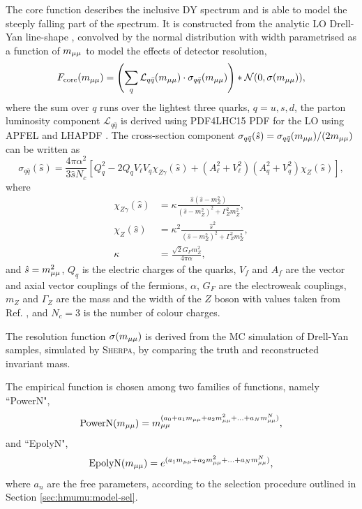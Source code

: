The core function describes the inclusive DY spectrum and
is able to model the steeply falling part of the spectrum.
It is constructed from the analytic LO Drell-Yan line-shape
\cite{Aaboud:2017ffb}, convolved by the normal distribution
with width parametrised as a function of $m_{\mu\mu}$ to model
the effects of detector resolution,
\begin{equation}
F_\text{core}(m_{\mu\mu}) =
\left( \sum_q \mathcal{L}_{q\bar q}(m_{\mu\mu}) \cdot \sigma_{q\bar q}(m_{\mu\mu}) \right) * \mathcal{N}(0, \sigma(m_{\mu\mu})),
\end{equation}
where the sum over $q$ runs over the lightest three quarks,
$q = u, s, d$, the parton luminosity component $\mathcal{L}_{q\bar q}$
is derived using PDF4LHC15 PDF for the LO using APFEL
\cite{Bertone:2013vaa} and LHAPDF \cite{Buckley:2014ana}.
The cross-section component
$\sigma_{q\bar q}(\hat s) = \sigma_{q\bar q}(m_{\mu\mu}) / (2m_{\mu\mu})$
can be written as \cite{ATLAS-CONF-2019-028}
\begin{equation}
\sigma_{q\bar q}(\hat s) = \frac{4\pi \alpha^2}{3\hat s N_c}
\left[
Q_q^2 - 2 Q_q V_\ell V_q \chi_{Z\gamma} (\hat s) +
(A_\ell^2 + V_\ell^2) (A_q^2 + V_q^2) \chi_Z(\hat s)
\right],
\end{equation}
where
\begin{align}
 \chi_{Z\gamma}(\hat s) & = \kappa \frac{\hat s (\hat s - m_Z^2)}{(\hat s - m_Z^2)^2 + \Gamma_Z^2 m_Z^2}, \\
 \chi_{Z}(\hat s)       & = \kappa^2 \frac{{\hat s}^2}{(\hat s - m_Z^2)^2 + \Gamma_Z^2 m_Z^2}, \\
 \kappa                 & = \frac{\sqrt{2}G_Fm_Z^2}{4\pi \alpha},
\end{align}
and $\hat s = m_{\mu\mu}^2$, $Q_q$ is the electric charges of the quarks,
$V_f$ and $A_f$ are the vector and axial vector couplings of the fermions,
$\alpha$, $G_F$ are the electroweak couplings,
$m_Z$ and $\Gamma_Z$ are the mass and the width of the $Z$ boson with values
taken from Ref. \cite{Patrignani:2016xqp},
and $N_c = 3$ is the number of colour charges.

The resolution function $\sigma(m_{\mu\mu})$ is derived from the
MC simulation of Drell-Yan samples, simulated by \textsc{Sherpa},
by comparing the truth and reconstructed invariant mass.

The empirical function is chosen among two families of functions,
namely ``PowerN",
\begin{equation}
\text{PowerN}(m_{\mu\mu}) = m_{\mu\mu}^{(a_0 + a_1m_{\mu\mu} + a_2 m_{\mu\mu}^2 + ... + a_Nm_{\mu\mu}^N)},
\end{equation}
and ``EpolyN",
\begin{equation}
\text{EpolyN}(m_{\mu\mu}) = e^{(a_1m_{\mu\mu} + a_2 m_{\mu\mu}^2 + ... + a_Nm_{\mu\mu}^N)},
\end{equation}
where $a_n$ are the free parameters, according to the selection
procedure outlined in Section \ref{sec:hmumu:model-sel}.


